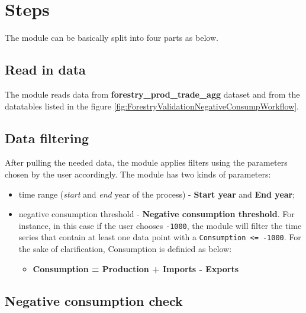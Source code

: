 \documentclass[
]{book}
\providecommand{\tightlist}{%
  \setlength{\itemsep}{0pt}\setlength{\parskip}{0pt}}
\begin{document}
\hypertarget{steps-5}{%
\section{\texorpdfstring{\textbf{Steps}}{Steps}}\label{steps-5}}

The module can be basically split into four parts as below.

\hypertarget{read-in-data-1}{%
\subsection{Read in data}\label{read-in-data-1}}

The module reads data from \textbf{forestry\_prod\_trade\_agg} dataset and from the datatables listed in the figure \ref{fig:ForestryValidationNegativeConsumpWorkflow}.

\hypertarget{data-filtering-1}{%
\subsection{Data filtering}\label{data-filtering-1}}

After pulling the needed data, the module applies filters using the parameters chosen by the user accordingly. The module has two kinds of parameters:

\begin{itemize}
\item
  time range (\emph{start} and \emph{end} year of the process) - \textbf{Start year} and \textbf{End year};
\item
  negative consumption threshold - \textbf{Negative consumption threshold}. For instance, in this case if the user chooses \texttt{-1000}, the module will filter the time series that contain at least one data point with a \texttt{Consumption\ \textless{}=\ -1000}. For the sake of clarification, Consumption is definied as below:

  \begin{itemize}
  \tightlist
  \item
    \textbf{Consumption = Production + Imports - Exports}
  \end{itemize}
\end{itemize}

\hypertarget{negative-consumption-check}{%
\subsection{Negative consumption check}\label{negative-consumption-check}}
\end{document}
